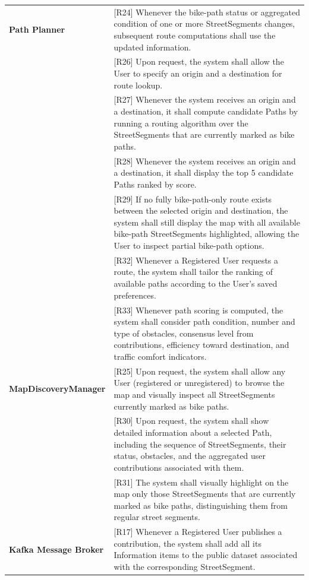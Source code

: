 \begin{center}
\begin{longtable}{p{0.30\linewidth}p{0.70\linewidth}}
\textbf{Path Planner} &
[R24] Whenever the bike-path status or aggregated condition of one or more StreetSegments changes, subsequent route computations shall use the updated information. \\
& [R26] Upon request, the system shall allow the User to specify an origin and a destination for
route lookup. \\
& [R27] Whenever the system receives an origin and a destination, it shall compute candidate Paths by running a routing algorithm over the StreetSegments that are currently marked as bike paths. \\
& [R28] Whenever the system receives an origin and a destination, it shall display the top 5 candidate Paths ranked by score. \\
& [R29] If no fully bike-path-only route exists between the selected origin and destination, the
system shall still display the map with all available bike-path StreetSegments highlighted,
allowing the User to inspect partial bike-path options. \\
& [R32] Whenever a Registered User requests a route, the system shall tailor the ranking of available paths according to the User’s saved preferences. \\
& [R33] Whenever path scoring is computed, the system shall consider path condition, number and type of obstacles, consensus level from contributions, efficiency toward destination, and traffic comfort indicators. \\


\hline

\textbf{MapDiscoveryManager} &
[R25] Upon request, the system shall allow any User (registered or unregistered) to browse the map and visually inspect all StreetSegments currently marked as bike paths. \\
& [R30] Upon request, the system shall show detailed information about a selected Path, including the sequence of StreetSegments, their status, obstacles, and the aggregated user contributions associated with them. \\
& [R31] The system shall visually highlight on the map only those StreetSegments that are
currently marked as bike paths, distinguishing them from regular street segments. \\
\hline

\textbf{Kafka Message Broker} &
[R17] Whenever a Registered User publishes a contribution, the system shall add all its Information items to the public dataset associated with the corresponding StreetSegment. \\
\hline


\end{longtable}
\end{center}
